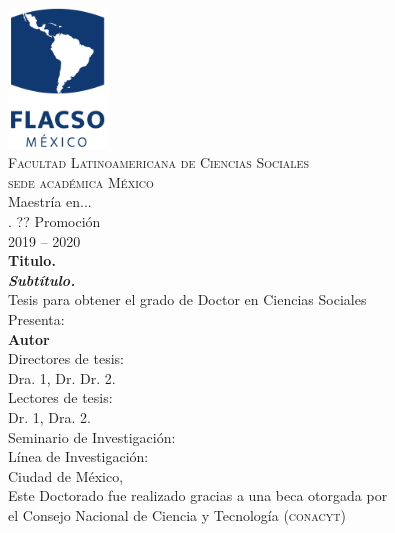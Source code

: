 \documentclass[a4paper,12pt]{report}
\begin{document}

\begin{titlepage}
   \begin{center}
       \vspace*{0.2cm}
        \includegraphics[width=0.2\textwidth]{LogoFlacso.png} \\ %
       \vspace*{0.2cm}
	\textsc{Facultad Latinoamericana de Ciencias Sociales} \\
	\textsc{sede académica México} \\
	Maestría en... \\. %
	?? Promoción\\ %
	2019 -- 2020 \\ %
       \vspace{0.3cm}	
       \textbf{\large{Titulo.}  \\ \normalsize \textsl{Subtítulo.} \\}
        \vspace{0.3cm}
        Tesis para obtener el grado de Doctor en Ciencias Sociales\\
        \vspace{0.3cm}
        Presenta: \\
        \textbf{Autor}\\
        \vspace{0.2cm}
	\normalsize {Directores de tesis:} \\
	\normalsize {\textsf{Dra. 1}},
	\normalsize {\textsf{Dr. Dr. 2}}.
	\\
	\normalsize {Lectores de tesis:} \\
	\normalsize {\textsf{Dr. 1},}
	\normalsize {\textsf{Dra. 2}.}
       \vspace{0.4cm}\\
Seminario de Investigación: \\ %
Línea de Investigación:  \\ %
       \vspace{0.5cm}
Ciudad de México,  \\ %
       \vspace{0.5cm}
\footnotesize{Este Doctorado fue realizado gracias a una beca otorgada por \\
el Consejo Nacional de Ciencia y Tecnología (\textsc{conacyt})}\\
       \vfill
 
   \end{center}
\end{titlepage}
\end{document}
